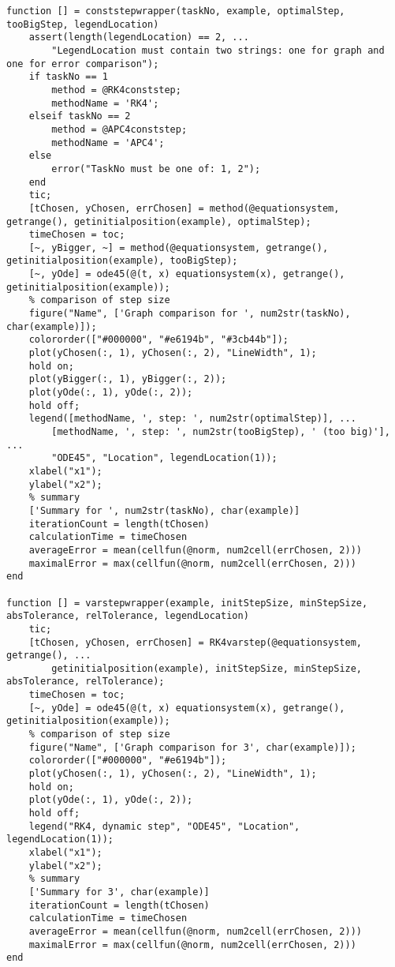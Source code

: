 \documentclass[12pt]{article}
\begin{document}
\begin{verbatim}
function [] = conststepwrapper(taskNo, example, optimalStep, tooBigStep, legendLocation)
    assert(length(legendLocation) == 2, ...
        "LegendLocation must contain two strings: one for graph and one for error comparison");
    if taskNo == 1
        method = @RK4conststep;
        methodName = 'RK4';
    elseif taskNo == 2
        method = @APC4conststep;
        methodName = 'APC4';
    else
        error("TaskNo must be one of: 1, 2");
    end
    tic;
    [tChosen, yChosen, errChosen] = method(@equationsystem, getrange(), getinitialposition(example), optimalStep);
    timeChosen = toc;
    [~, yBigger, ~] = method(@equationsystem, getrange(), getinitialposition(example), tooBigStep);
    [~, yOde] = ode45(@(t, x) equationsystem(x), getrange(), getinitialposition(example));
    % comparison of step size
    figure("Name", ['Graph comparison for ', num2str(taskNo), char(example)]);
    colororder(["#000000", "#e6194b", "#3cb44b"]);
    plot(yChosen(:, 1), yChosen(:, 2), "LineWidth", 1);
    hold on;
    plot(yBigger(:, 1), yBigger(:, 2));
    plot(yOde(:, 1), yOde(:, 2));
    hold off;
    legend([methodName, ', step: ', num2str(optimalStep)], ...
        [methodName, ', step: ', num2str(tooBigStep), ' (too big)'], ...
        "ODE45", "Location", legendLocation(1));
    xlabel("x1");
    ylabel("x2");
    % summary
    ['Summary for ', num2str(taskNo), char(example)]
    iterationCount = length(tChosen)
    calculationTime = timeChosen
    averageError = mean(cellfun(@norm, num2cell(errChosen, 2)))
    maximalError = max(cellfun(@norm, num2cell(errChosen, 2)))
end

function [] = varstepwrapper(example, initStepSize, minStepSize, absTolerance, relTolerance, legendLocation)
    tic;
    [tChosen, yChosen, errChosen] = RK4varstep(@equationsystem, getrange(), ...
        getinitialposition(example), initStepSize, minStepSize, absTolerance, relTolerance);
    timeChosen = toc;
    [~, yOde] = ode45(@(t, x) equationsystem(x), getrange(), getinitialposition(example));
    % comparison of step size
    figure("Name", ['Graph comparison for 3', char(example)]);
    colororder(["#000000", "#e6194b"]);
    plot(yChosen(:, 1), yChosen(:, 2), "LineWidth", 1);
    hold on;
    plot(yOde(:, 1), yOde(:, 2));
    hold off;
    legend("RK4, dynamic step", "ODE45", "Location", legendLocation(1));
    xlabel("x1");
    ylabel("x2");
    % summary
    ['Summary for 3', char(example)]
    iterationCount = length(tChosen)
    calculationTime = timeChosen
    averageError = mean(cellfun(@norm, num2cell(errChosen, 2)))
    maximalError = max(cellfun(@norm, num2cell(errChosen, 2)))
end
\end{verbatim}
\end{document}
